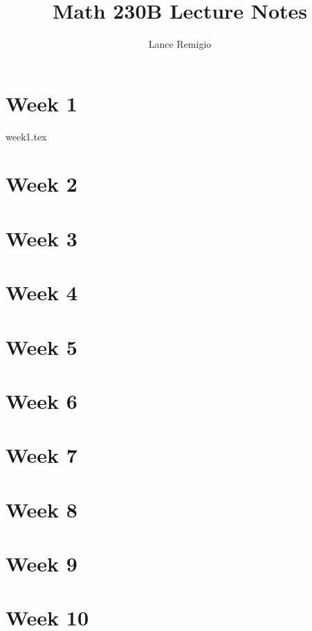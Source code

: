 \documentclass[a4paper]{book}
\title{Math 230B Lecture Notes}
\author{Lance Remigio}
\begin{document}
\maketitle

\chapter{Week 1}

{week1.tex}

\chapter{Week 2}



\chapter{Week 3}



\chapter{Week 4}



\chapter{Week 5}



\chapter{Week 6}



\chapter{Week 7}



\chapter{Week 8}



\chapter{Week 9}



\chapter{Week 10}
\end{document}
